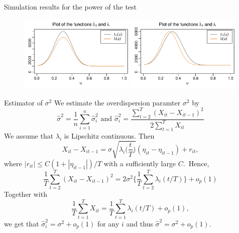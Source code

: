 \documentclass[10pt, handout]{beamer}
\begin{document}
\begin{frame}{Simulation results for the power of the test}
\begin{figure}[t!]
	\includegraphics[width = 0.49\textwidth, height = 0.4\textheight]{plots/lambda_fcts_height}
	\onslide<2->\includegraphics[width = 0.49\textwidth, height = 0.4\textheight]{plots/lambda_fcts_shift}	
\end{figure}\pause
\vspace{-5mm}
{\scriptsize{\begin{table}[t]
\begin{center}
\caption{Power of the multiscale test for scenario A}
\label{tab:size_shape}

\end{center}
\end{table}}}
{
\vspace{-39.5mm}
\scriptsize{\begin{table}[t]
\begin{center}
\caption{Power of the multiscale test for scenario B}
\label{tab:size_shape}

\end{center}
\end{table}}}
\end{frame}

\begin{frame}[label = frame_sigma]{Estimator of ${\sigma}^2$}
We estimate the overdispersion paramter $\sigma^2$ by \[\widehat{\sigma}^2= \frac{1}{n} \sum_{i = 1}^n \hat{\sigma}_i^2 \text{ and } \hat{\sigma}_i^2 = \frac{\sum_{t=2}^T (X_{it}-X_{it-1})^2}{2 \sum_{t=1}^T X_{it}}\] \pause
We assume that $\lambda_i$ is Lipschitz continuous. Then
\[ X_{it} - X_{it-1} = \sigma \sqrt{\lambda_i\Big(\frac{t}{T}\Big)} (\eta_{it} - \eta_{it-1}) + r_{it}, \]
where $|r_{it}| \le C(1+|\eta_{it-1}|)/T$ with a sufficiently large $C$.\pause \, Hence,
\[ \frac{1}{T} \sum_{t=2}^T (X_{it} - X_{it-1})^2 = 2 \sigma^2 \Big\{ \frac{1}{T} \sum_{t=2}^T \lambda_i(t/T) \Big\} + o_p(1)\] \pause
Together with \[ \frac{1}{T} \sum_{t=1}^T X_{it} = \frac{1}{T} \sum_{t=1}^T \lambda_i(t/T) + o_p(1), \] we get that $\hat{\sigma}_i^2 = \sigma^2 + o_p(1)$ for any $i$ and thus $\hat{\sigma}^2 = \sigma^2 + o_p(1)$. \hyperlink{frame_teststatistic<4>}{}
\end{frame}
\end{document}
